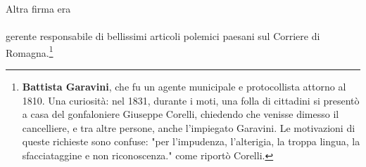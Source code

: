 \indent Altra firma era
\\ \\ \normalfont
\indent gerente responsabile di bellissimi articoli polemici paesani sul Corriere di Romagna.\footnote{\textbf{Battista Garavini}, che fu un agente municipale  e protocollista attorno al 1810. Una curiosità: nel 1831, durante i moti, una folla di cittadini si presentò a casa del gonfaloniere Giuseppe Corelli, chiedendo che venisse dimesso il cancelliere,  e tra altre persone, anche l'impiegato Garavini. Le motivazioni di queste richieste sono confuse: "per l'impudenza, l'alterigia, la troppa lingua, la sfacciataggine e non riconoscenza." come riportò Corelli.}





